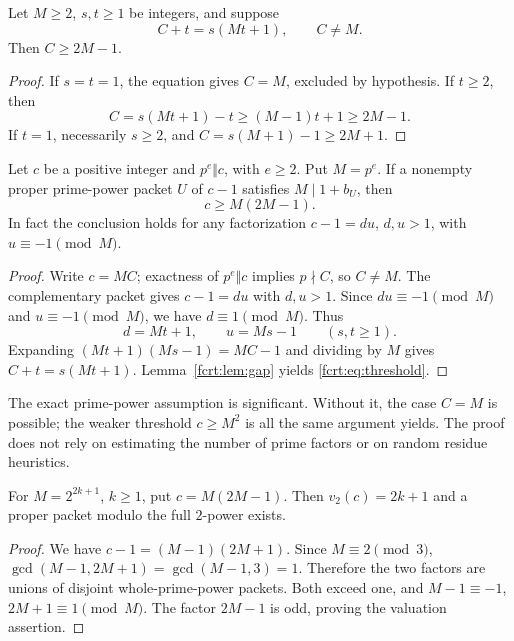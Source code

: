 \begin{lemma}\label{fcrt:lem:gap}
Let \(M\ge2\), \(s,t\ge1\) be integers, and suppose
\[
 C+t=s(Mt+1),\qquad C\ne M.
\]
Then \(C\ge2M-1\).
\end{lemma}
\begin{proof}
If \(s=t=1\), the equation gives \(C=M\), excluded by hypothesis.
If \(t\ge2\), then
\[
 C=s(Mt+1)-t\ge (M-1)t+1\ge2M-1.
\]
If \(t=1\), necessarily \(s\ge2\), and
\(C=s(M+1)-1\ge2M+1\).
\end{proof}

\begin{theorem}\label{fcrt:thm:noface}
Let \(c\) be a positive integer and \(p^e\Vert c\), with \(e\ge2\).
Put \(M=p^e\). If a nonempty proper prime-power packet \(U\) of \(c-1\)
satisfies \(M\mid1+b_U\), then
\begin{equation}\label{fcrt:eq:threshold} c\ge M(2M-1).\end{equation}
In fact the conclusion holds for any factorization
\(c-1=du\), \(d,u>1\), with \(u\equiv-1\pmod M\).
\end{theorem}
\begin{proof}
Write \(c=MC\); exactness of \(p^e\Vert c\) implies \(p\nmid C\),
so \(C\ne M\). The complementary packet gives
\(c-1=du\) with \(d,u>1\). Since \(du\equiv-1\pmod M\) and
\(u\equiv-1\pmod M\), we have \(d\equiv1\pmod M\). Thus
\[
 d=Mt+1,\qquad u=Ms-1\qquad(s,t\ge1).
\]
Expanding \((Mt+1)(Ms-1)=MC-1\) and dividing by \(M\) gives
\(C+t=s(Mt+1)\). Lemma~\ref{fcrt:lem:gap} yields \eqref{fcrt:eq:threshold}.
\end{proof}

The exact prime-power assumption is significant. Without it, the case
\(C=M\) is possible; the weaker threshold \(c\ge M^2\) is all the same
argument yields. The proof does not rely on estimating the number of
prime factors or on random residue heuristics.

\begin{proposition}
For \(M=2^{2k+1}\), \(k\ge1\), put \(c=M(2M-1)\). Then
\(v_2(c)=2k+1\) and a proper packet modulo the full \(2\)-power exists.
\end{proposition}
\begin{proof}
We have \(c-1=(M-1)(2M+1)\). Since \(M\equiv2\pmod3\),
\(\gcd(M-1,2M+1)=\gcd(M-1,3)=1\). Therefore the two factors are
unions of disjoint whole-prime-power packets. Both exceed one, and
\(M-1\equiv-1\), \(2M+1\equiv1\pmod M\).
The factor \(2M-1\) is odd, proving the valuation assertion.
\end{proof}

